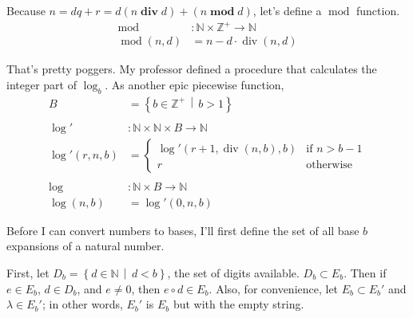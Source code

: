 \documentclass[a5paper, fleqn]{article}
\DeclareMathOperator{\Div}{div}
\DeclareMathOperator{\Mod}{mod}
\newcommand{\nat}{\mathbb{N}}
\newcommand{\posint}{\mathbb{Z}^+}
\begin{document}
Because $n = dq + r = d(n \;\textbf{div}\; d) + (n \;\textbf{mod}\; d)$, let's
define a $\Mod$ function.
\begin{align*}
  \Mod       & : \nat \times \posint \to
  \nat                                   \\
  \Mod(n, d) & = n - d \cdot \Div(n, d)
\end{align*}

That's pretty poggers. My professor defined a procedure that calculates the
integer part of $\log_b$. As another epic piecewise function,
\begin{align*}
  B              & = \left\{ b \in \posint \,\middle|\, b > 1 \right\}  \\
  \\
  \log'          & : \nat \times \nat \times B \to \nat                 \\
  \log'(r, n, b) & = \begin{cases}
                       \log'(r + 1, \Div(n, b), b) & \text{if } n > b - 1 \\
                       r                           & \text{otherwise}
                     \end{cases} \\
  \\
  \log           & : \nat \times B \to \nat                             \\
  \log(n, b)     & = \log'(0, n, b)
\end{align*}

Before I can convert numbers to bases, I'll first define the set of all base $b$
expansions of a natural number.

First, let $D_b = \left\{ d \in \nat \,\middle|\, d < b \right\}$, the set of
digits available. $D_b \subset E_b$. Then if $e \in E_b$, $d \in D_b$, and $e
  \neq 0$, then $e \circ d \in E_b$. Also, for convenience, let $E_b \subset E_b'$
and $\lambda \in E_b'$; in other words, $E_b'$ is $E_b$ but with the empty
string.
\end{document}
